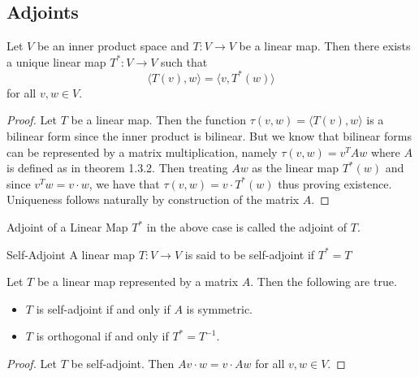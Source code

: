 \subsection{Adjoints}
\begin{prp}{}{} Let $V$ be an inner product space and $T:V\to V$ be a linear map. Then there exists a unique linear map $T^\ast:V\to V$ such that $$\langle T(v), w\rangle=\langle v, T^\ast(w)\rangle$$ for all $v,w\in V$. \tcbline
\begin{proof}
Let $T$ be a linear map. Then the function $\tau(v,w)=\langle T(v), w\rangle$ is a bilinear form since the inner product is bilinear. But we know that bilinear forms can be represented by a matrix multiplication, namely $\tau(v,w)=v^TAw$ where $A$ is defined as in theorem 1.3.2. Then treating $Aw$ as the linear map $T^\ast(w)$ and since $v^Tw=v\cdot w$, we have that $\tau(v,w)=v\cdot T^\ast(w)$ thus proving existence. Uniqueness follows naturally by construction of the matrix $A$. 
\end{proof}
\end{prp}

\begin{defn}{Adjoint of a Linear Map}{} $T^\ast$ in the above case is called the adjoint of $T$. 
\end{defn}

\begin{defn}{Self-Adjoint}{} A linear map $T:V\to V$ is said to be self-adjoint if $T^*=T$
\end{defn}

\begin{prp}{}{} Let $T$ be a linear map represented by a matrix $A$. Then the following are true. 
\begin{itemize}
\item $T$ is self-adjoint if and only if $A$ is symmetric. 
\item $T$ is orthogonal if and only if $T^\ast=T^{-1}$. 
\end{itemize}
\tcbline
\begin{proof}
Let $T$ be self-adjoint. Then $Av\cdot w=v\cdot Aw$ for all $v,w\in V$. 
\end{proof}
\end{prp}

